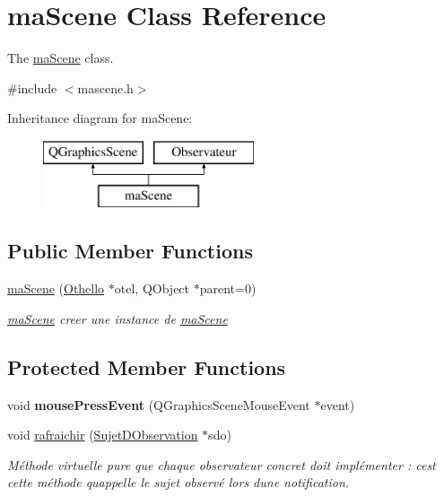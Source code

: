 \hypertarget{classma_scene}{}\section{ma\+Scene Class Reference}
\label{classma_scene}


The \hyperlink{classma_scene}{ma\+Scene} class.  




{\ttfamily \#include $<$mascene.\+h$>$}

Inheritance diagram for ma\+Scene\+:\begin{figure}[H]
\begin{center}
\leavevmode
\includegraphics[height=2.000000cm]{classma_scene}
\end{center}
\end{figure}
\subsection*{Public Member Functions}
\begin{DoxyCompactItemize}
\item 
\hyperlink{classma_scene_ad8365755592373b91213473b9e589612}{ma\+Scene} (\hyperlink{class_othello}{Othello} $\ast$otel, Q\+Object $\ast$parent=0)
\begin{DoxyCompactList}\small\item\em \hyperlink{classma_scene}{ma\+Scene} creer une instance de \hyperlink{classma_scene}{ma\+Scene} \end{DoxyCompactList}\end{DoxyCompactItemize}
\subsection*{Protected Member Functions}
\begin{DoxyCompactItemize}
\item 
\hypertarget{classma_scene_aedcc2e6c3a61b134360abca67b6151d5}{}void {\bfseries mouse\+Press\+Event} (Q\+Graphics\+Scene\+Mouse\+Event $\ast$event)\label{classma_scene_aedcc2e6c3a61b134360abca67b6151d5}

\item 
void \hyperlink{classma_scene_a1a985741a00343a2024fb30154912140}{rafraichir} (\hyperlink{class_sujet_d_observation}{Sujet\+D\+Observation} $\ast$sdo)
\begin{DoxyCompactList}\small\item\em Méthode virtuelle pure que chaque observateur concret doit implémenter \+: c\textquotesingle{}est cette méthode qu\textquotesingle{}appelle le sujet observé lors d\textquotesingle{}une notification. \end{DoxyCompactList}\end{DoxyCompactItemize}



